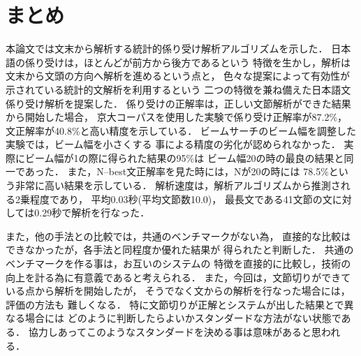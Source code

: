 \section{まとめ}

本論文では文末から解析する統計的係り受け解析アルゴリズムを示した．
日本語の係り受けは，ほとんどが前方から後方であるという
特徴を生かし，解析は文末から文頭の方向へ解析を進めるという点と，
色々な提案によって有効性が示されている統計的文解析を利用するという
二つの特徴を兼ね備えた日本語文係り受け解析を提案した．
係り受けの正解率は，正しい文節解析ができた結果から開始した場合，
京大コーパスを使用した実験で係り受け正解率が87.2\%，
文正解率が40.8\%と高い精度を示している．
ビームサーチのビーム幅を調整した実験では，ビーム幅を小さくする
事による精度の劣化が認められなかった．
実際にビーム幅が1の際に得られた結果の95\%は
ビーム幅20の時の最良の結果と同一であった．
また，N--best文正解率を見た時には，Nが20の時には
78.5\%という非常に高い結果を示している．
解析速度は，解析アルゴリズムから推測される2乗程度であり，
平均0.03秒(平均文節数10.0)，
最長文である41文節の文に対しては0.29秒で解析を行なった．

また，他の手法との比較では，共通のベンチマークがない為，
直接的な比較はできなかったが，各手法と同程度か優れた結果が
得られたと判断した．
共通のベンチマークを作る事は，お互いのシステムの
特徴を直接的に比較し，技術の向上を計る為に有意義であると考えられる．
また，今回は，文節切りができている点から解析を開始したが，
そうでなく文からの解析を行なった場合には，評価の方法も
難しくなる．
特に文節切りが正解とシステムが出した結果とで異なる場合には
どのように判断したらよいかスタンダードな方法がない状態である．
協力しあってこのようなスタンダードを決める事は意味があると思われる．





\begin{biography}


\end{biography}



